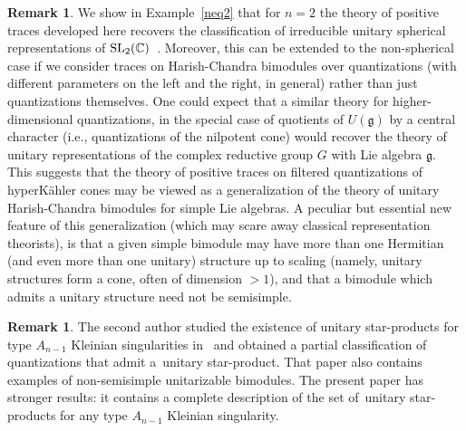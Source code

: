 \documentclass[pdftex]{sigma}
\newcommand{\g}{\mathfrak{g}}
\theoremstyle{definition}
\newtheorem{Remark}[Theorem]{Remark}
\numberwithin{equation}{section}
\begin{document}
\begin{Remark} We show in Example~\ref{neq2} that for $n=2$ the theory of positive traces developed here recovers the classification of irreducible unitary spherical representations of ${\rm SL}_2(\mathbb C)$~\cite{V}. Moreover,
this can be extended to the non-spherical case if we consider
traces on Harish-Chandra bimodules over quantizations (with different parameters on the left and the right, in general) rather than just quantizations themselves. One could expect that a similar theory for higher-dimensional quantizations, in the special case of quotients of $U(\g)$ by a central character (i.e., quantizations of the nilpotent cone) would recover the theory of unitary representations of the complex reductive group $G$ with Lie algebra $\g$. This suggests that the theory of positive traces on filtered quantizations of hyperK\"ahler cones may be viewed as a generalization of the theory of unitary Harish-Chandra bimodules for simple Lie algebras. A peculiar but essential new feature of this generalization (which may scare away classical representation theorists), is that a given simple bimodule may have more than one Hermitian (and even more than one unitary) structure up to scaling (namely, unitary structures form a cone, often of dimension $>1$), and that a bimodule which admits a unitary structure need not be semisimple.
\end{Remark}

\begin{Remark}
The second author studied the existence of unitary star-products for type $A_{n-1}$ Kleinian singularities in~\cite{K1} and obtained a partial classification of quantizations that admit a~unitary star-product. That paper also contains examples of non-semisimple unitarizable bimo\-dules. The present paper has stronger results: it contains a complete description of the set of~unitary star-products for any type $A_{n-1}$ Kleinian singularity.
\end{Remark}
\end{document}
